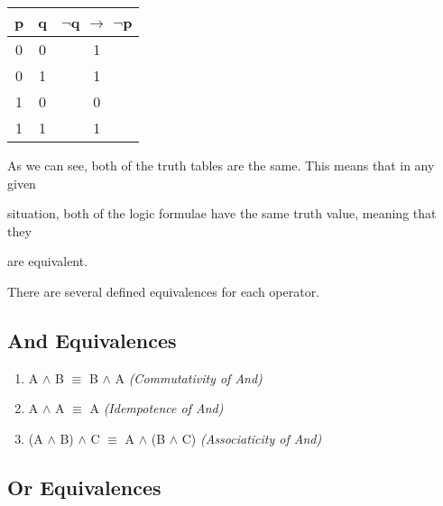 \documentclass{report}
\begin{document}
\begin{center}

  \begin{tabular}{| c | c | c |}

    \hline

    p & q & $\neg$q $\to$ $\neg$p \\ \hline

    0 & 0 & 1 \\

    0 & 1 & 1 \\

    1 & 0 & 0 \\

    1 & 1 & 1 \\ \hline

  \end{tabular}

\end{center}



As we can see, both of the truth tables are the same. This means that in any given

situation, both of the logic formulae have the same truth value, meaning that they

are equivalent.



There are several defined equivalences for each operator.



\subsection{And Equivalences}

\begin{enumerate}



  \item A $\land$ B $\equiv$ B $\land$ A \emph{(Commutativity of And)}

  \item A $\land$ A $\equiv$ A \emph{(Idempotence of And)}

  \item (A $\land$ B) $\land$ C $\equiv$ A $\land$ (B $\land$ C) \emph{(Associaticity of And)}



\end{enumerate}



\subsection{Or Equivalences}
\end{document}
